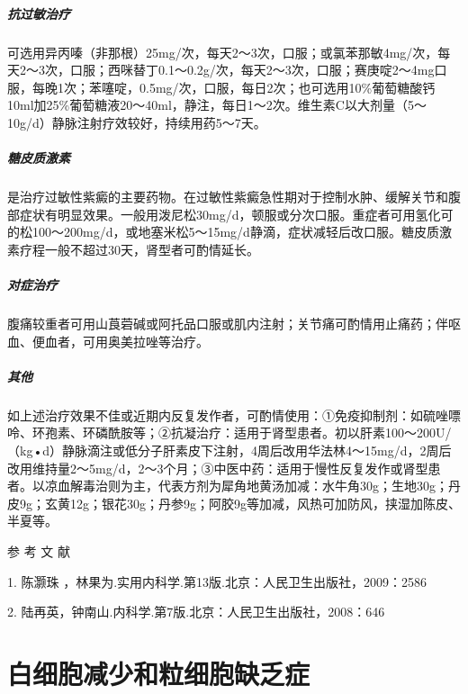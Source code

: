 \paragraph{抗过敏治疗}

可选用异丙嗪（非那根）25mg/次，每天2～3次，口服；或氯苯那敏4mg/次，每天2～3次，口服；西咪替丁0.1～0.2g/次，每天2～3次，口服；赛庚啶2～4mg口服，每晚1次；苯噻啶，0.5mg/次，口服，每日2次；也可选用10\%葡萄糖酸钙10ml加25\%葡萄糖液20～40ml，静注，每日1～2次。维生素C以大剂量（5～10g/d）静脉注射疗效较好，持续用药5～7天。

\paragraph{糖皮质激素}

是治疗过敏性紫癜的主要药物。在过敏性紫癜急性期对于控制水肿、缓解关节和腹部症状有明显效果。一般用泼尼松30mg/d，顿服或分次口服。重症者可用氢化可的松100～200mg/d，或地塞米松5～15mg/d静滴，症状减轻后改口服。糖皮质激素疗程一般不超过30天，肾型者可酌情延长。

\paragraph{对症治疗}

腹痛较重者可用山莨菪碱或阿托品口服或肌内注射；关节痛可酌情用止痛药；伴呕血、便血者，可用奥美拉唑等治疗。

\paragraph{其他}

如上述治疗效果不佳或近期内反复发作者，可酌情使用：①免疫抑制剂：如硫唑嘌呤、环孢素、环磷酰胺等；②抗凝治疗：适用于肾型患者。初以肝素100～200U/（kg•d）静脉滴注或低分子肝素皮下注射，4周后改用华法林4～15mg/d，2周后改用维持量2～5mg/d，2～3个月；③中医中药：适用于慢性反复发作或肾型患者。以凉血解毒治则为主，代表方剂为犀角地黄汤加减：水牛角30g；生地30g；丹皮9g；玄黄12g；银花30g；丹参9g；阿胶9g等加减，风热可加防风，挟湿加陈皮、半夏等。

\hypertarget{text00335.htmlux5cux23CHP12-1-5-4}{}
参 考 文 献

1. 陈灏珠 ，林果为.实用内科学.第13版.北京：人民卫生出版社，2009：2586

2. 陆再英，钟南山.内科学.第7版.北京：人民卫生出版社，2008：646

\protect\hypertarget{text00336.html}{}{}

\chapter{白细胞减少和粒细胞缺乏症}

